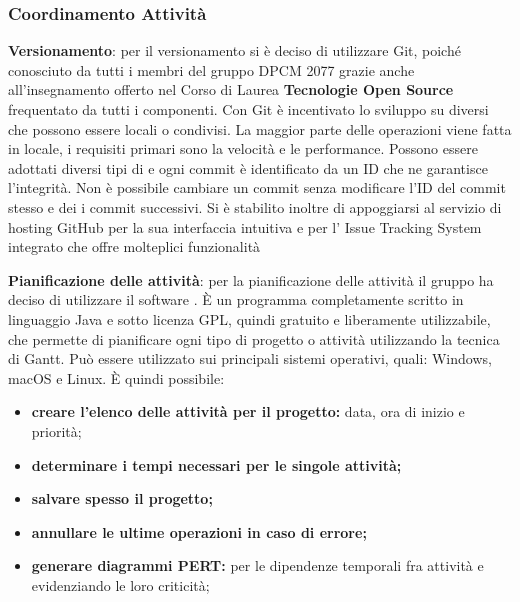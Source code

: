 \subsubsection{Coordinamento Attività}
\begin{description}
\item{\textbf{Versionamento}}: per il versionamento si è deciso di utilizzare Git, poiché conosciuto da tutti i membri del gruppo DPCM 2077 grazie anche all'insegnamento offerto
nel Corso di Laurea \textbf{Tecnologie Open Source} frequentato da tutti i componenti. Con Git è incentivato lo sviluppo su  diversi che possono essere locali o condivisi.
La maggior parte delle operazioni viene fatta in locale, i requisiti primari sono la velocità e le performance.
Possono essere adottati diversi tipi di  e ogni commit è identificato da un ID che ne garantisce l'integrità.
Non è possibile cambiare un commit senza modificare l’ID del commit stesso e dei i commit successivi.  
Si è stabilito inoltre di appoggiarsi al servizio di hosting GitHub per la sua interfaccia intuitiva e per l' Issue Tracking System integrato che offre molteplici funzionalità

\item{\textbf{Pianificazione delle attività}}:  per la pianificazione delle attività il gruppo ha deciso di utilizzare il software \textbf{}. 
È un programma completamente scritto in linguaggio Java e sotto licenza GPL, quindi gratuito e liberamente utilizzabile, che permette di pianificare ogni tipo di progetto o attività utilizzando la tecnica di Gantt.
Può essere utilizzato sui principali sistemi operativi, quali: Windows, macOS e Linux.
È quindi possibile:
\begin{itemize}
\item{\textbf{creare l'elenco delle attività per il progetto:} data, ora di inizio e priorità;}
\item{\textbf{determinare i tempi necessari per le singole attività;}}
\item{\textbf{salvare spesso il progetto;}}
\item{\textbf{annullare le ultime operazioni in caso di errore;}}
\item{\textbf{generare diagrammi PERT:} per le dipendenze temporali fra attività e evidenziando le loro criticità;}
\end{itemize} 


\end{description}
